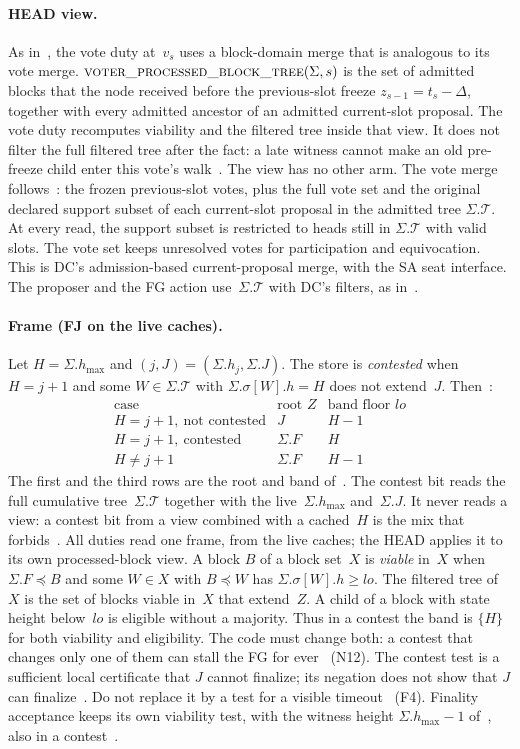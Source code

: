\documentclass{article}
\theoremstyle{plain}
\theoremstyle{definition}
\theoremstyle{remark}
\newcommand{\T}{\mathcal T}
\newcommand{\hmax}{h_{\max}}
\newcommand{\lo}{\mathit{lo}}
\newcommand{\DC}[1]{\cite[\S#1]{DC}}
\newcommand{\FJ}[1]{\cite[\S#1]{FJ}}
\newcommand{\LDP}[1]{\cite[\S#1]{LDP}}
\begin{document}
\paragraph{HEAD view.}  As in~\DC{7}, the vote duty at~$v_s$ uses a
block-domain merge that is analogous to its vote merge.
$\Call{voter\_processed\_block\_tree}{\Sigma,s}$ is the set of admitted
blocks that the node received before the previous-slot freeze
$z_{s-1}=t_s-\Delta$, together with every admitted ancestor of an
admitted current-slot proposal.  The vote duty recomputes viability and
the filtered tree inside that view.  It does not filter the full
filtered tree after the fact: a late witness cannot make an old
pre-freeze child enter this vote's walk~\DC{7}.  The view has no other
arm.  The vote merge follows~\DC{7}: the frozen previous-slot votes,
plus the full vote set and the original declared support subset of
each current-slot proposal in the admitted tree $\Sigma.\T$.
At every read, the support subset is restricted to heads still in
$\Sigma.\T$ with valid slots.  The vote set keeps unresolved votes
for participation and equivocation.  This is DC's admission-based
current-proposal merge, with the SA seat interface.  The proposer and
the FG action use~$\Sigma.\T$ with DC's filters, as in~\DC{7}.

\paragraph{Frame (FJ on the live caches).}  Let $H=\Sigma.\hmax$ and
$(j,J)=(\Sigma.h_j,\Sigma.J)$.  The store is \emph{contested} when $H=j+1$
and some $W\in\Sigma.\T$ with $\Sigma.\sigma[W].h=H$ does not extend~$J$.
Then~\FJ{2}:
\[
\begin{array}{lll}
 \text{case} & \text{root } Z & \text{band floor } \lo\\
 \hline
 H=j+1,\ \text{not contested} & J & H-1\\
 H=j+1,\ \text{contested} & \Sigma.F & H\\
 H\neq j+1 & \Sigma.F & H-1
\end{array}
\]
The first and the third rows are the root and band of~\DC{5}.  The
contest bit reads the full cumulative tree~$\Sigma.\T$ together with
the live~$\Sigma.\hmax$ and~$\Sigma.J$.  It never reads a view: a contest bit
from a view combined with a cached~$H$ is the mix that~\FJ{2}
forbids~\LDP{1}.  All duties read one frame, from the live caches; the
HEAD applies it to its own processed-block view.  A block $B$ of a
block set~$X$ is \emph{viable} in~$X$ when $\Sigma.F\preceq B$ and some
$W\in X$ with $B\preceq W$ has $\Sigma.\sigma[W].h\geq\lo$.  The
filtered tree of~$X$ is the set of blocks viable in~$X$ that extend~$Z$.
A child of a block with state height below~$\lo$ is eligible without a
majority.  Thus in a contest the band is $\{H\}$ for both viability and
eligibility.  The code must change both: a contest that changes only
one of them can stall the FG for ever~\FJ{7} (N12).  The contest test is
a sufficient local certificate that $J$ cannot finalize; its negation
does not show that $J$ can finalize~\FJ{3}.  Do not replace it by a
test for a visible timeout~\FJ{3} (F4).  Finality acceptance keeps its
own viability test, with the witness height $\Sigma.\hmax-1$ of~\DC{5},
also in a contest~\FJ{2}.
\end{document}
